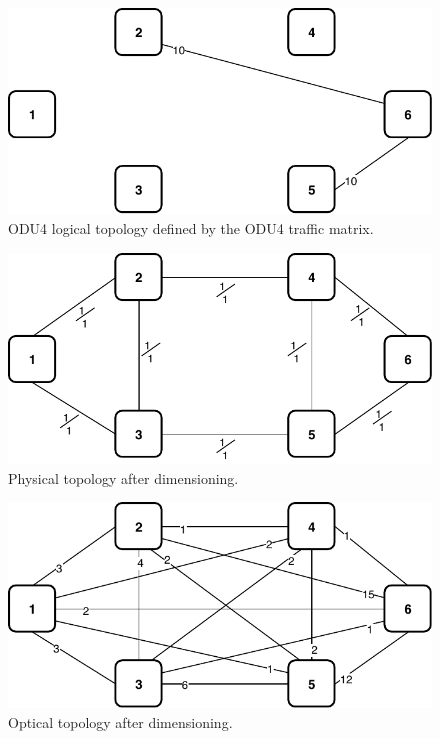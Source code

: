 \begin{figure}[h!]
\centering
\includegraphics[width=12cm]{sdf/ilp/transparent_protection/figures/logical_topology_ODU4_medium}
\caption{ODU4 logical topology defined by the ODU4 traffic matrix.}
\label{logical2_ODU4_protectionmedium}
\end{figure}

\newpage
\begin{figure}[h!]
\centering
\includegraphics[width=12cm]{sdf/ilp/transparent_protection/figures/physical_topology}
\caption{Physical topology after dimensioning.}
\label{physical2_protectionmedium}
\end{figure}

\vspace{17pt}
\begin{figure}[h!]
\centering
\includegraphics[width=12cm]{sdf/ilp/transparent_protection/figures/optical_topology_medium}
\caption{Optical topology after dimensioning.}
\label{optical2_protectionmedium}
\end{figure}


